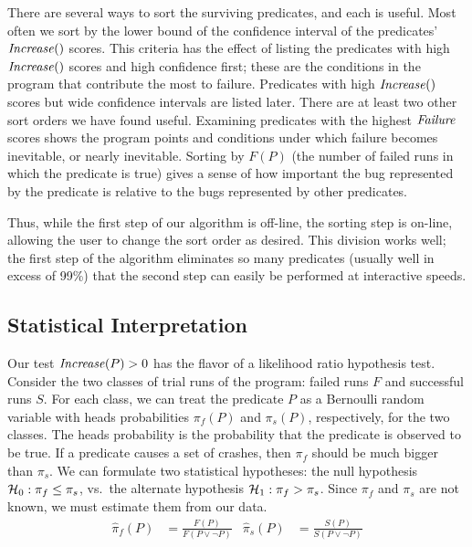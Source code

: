 There are several ways to sort the surviving predicates, and each is useful.
Most often we sort by the lower bound of the confidence interval of the predicates' $\mbox{\textit{Increase}}()$ scores.
This criteria has the effect of listing the predicates with high $\mbox{\textit{Increase}}()$ scores and high
confidence first; these are the conditions in the program that contribute the most to failure.
Predicates with high $\mbox{\textit{Increase}}()$ scores but wide confidence intervals are listed
later.  
There are at least two other sort orders we have found useful.  Examining 
predicates with the highest $\mbox{\textit{Failure}}$ scores shows the program points and conditions under which failure
becomes inevitable, or nearly inevitable.  Sorting by $F(P)$ (the number of failed runs in which the predicate
is true) gives a sense of how important the bug represented by the predicate is relative to the bugs represented
by other predicates. 

Thus, while the first step of our algorithm is off-line, the sorting step is on-line, allowing the user to change
the sort order as desired.  This division works well; the first step of the algorithm eliminates so many predicates
(usually well in excess of 99\%) that the second step can easily be performed at interactive speeds.

\subsection{Statistical Interpretation}

Our test $\mbox{\textit{Increase}}(P) > 0$ has the flavor of a likelihood ratio hypothesis
test.  Consider the two classes of trial runs
of the program: failed runs $F$ and successful runs $S$.  For each
class, we can treat the predicate $P$ as a Bernoulli random variable
with heads probabilities $\pi_f(P)$ and $\pi_s(P)$, respectively, for the
two classes.  The heads
probability is the probability that the predicate is observed to be
true.  If a predicate causes a set of crashes, then $\pi_f$ should be
much bigger than $\pi_s$.  We can formulate two statistical hypotheses:
the null hypothesis ${\mathcal{H}}_0:
\pi_f \leq \pi_s$, vs.\ the alternate hypothesis ${\mathcal{H}}_1: \pi_f > \pi_s$.  Since
$\pi_f$ and $\pi_s$ are not known, we must estimate them from our
data.
\begin{align*}
  \hat \pi_f(P) &= \frac{F(P)}{F(P \lor \lnot P)} &
  \hat \pi_s(P) &= \frac{S(P)}{S(P \lor \lnot P)}
\end{align*}

